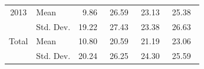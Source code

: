 \documentclass[11pt,a4paper,oneside]{article}
\begin{document}
\begin{table}[htbp]
\begin{tabular}{rlrrrr}
    \midrule
    \multicolumn{1}{c}{2013} & Mean  & 9.86\ & 26.59\ & 23.13\ & 25.38\ \\
          & Std. Dev. & 19.22\ & 27.43\ & 23.38\ & 26.63\ \\
    \midrule
    \multicolumn{1}{c}{Total} & Mean  & 10.80\ & 20.59\ & 21.19\ & 23.06\ \\
          & Std. Dev. & 20.24\ & 26.25\ & 24.30\ & 25.59\ \\
    \bottomrule
    \end{tabular}
  \label{tab:inputs_savings}
\end{table}

\vspace*{\fill}



\vspace*{\fill}

\end{document}
